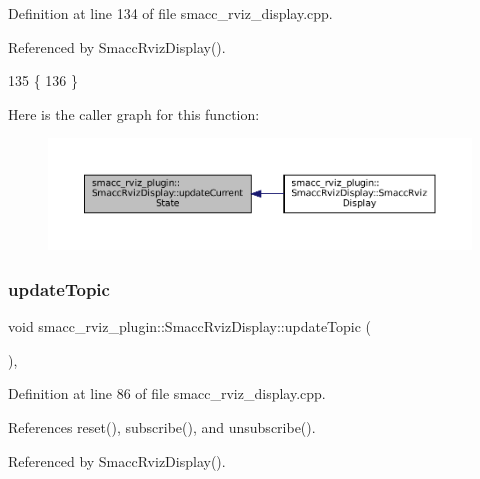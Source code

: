 Definition at line 134 of file smacc\+\_\+rviz\+\_\+display.\+cpp.



Referenced by Smacc\+Rviz\+Display().


\begin{DoxyCode}
135 \{  
136 \}
\end{DoxyCode}
Here is the caller graph for this function\+:
\nopagebreak
\begin{figure}[H]
\begin{center}
\leavevmode
\includegraphics[width=350pt]{classsmacc__rviz__plugin_1_1SmaccRvizDisplay_a6031090e46077a5e95754b5f70ea639a_icgraph}
\end{center}
\end{figure}
\mbox{\label{classsmacc__rviz__plugin_1_1SmaccRvizDisplay_adf332ae95bd83969b33ba713a60832fd}} 
\subsubsection{\texorpdfstring{update\+Topic}{updateTopic}}
{\footnotesize\ttfamily void smacc\+\_\+rviz\+\_\+plugin\+::\+Smacc\+Rviz\+Display\+::update\+Topic (\begin{DoxyParamCaption}{ }\end{DoxyParamCaption})\hspace{0.3cm}{\ttfamily [private]}, {\ttfamily [slot]}}



Definition at line 86 of file smacc\+\_\+rviz\+\_\+display.\+cpp.



References reset(), subscribe(), and unsubscribe().



Referenced by Smacc\+Rviz\+Display().


